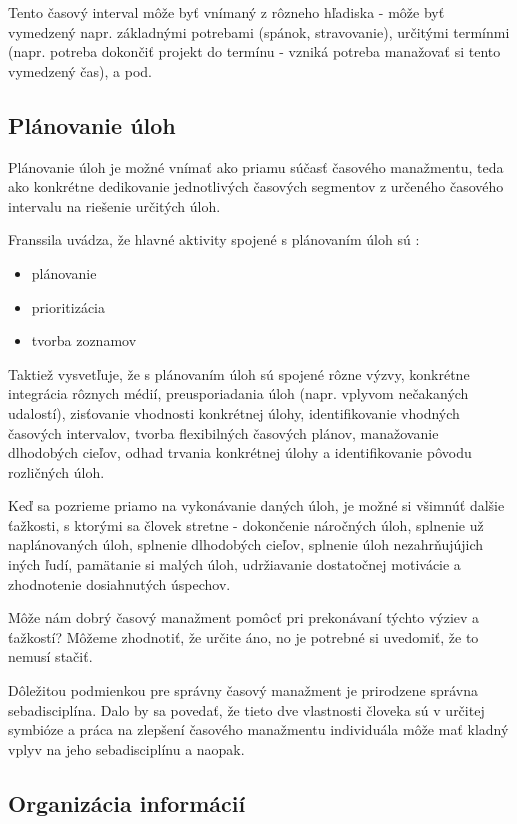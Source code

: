 \documentclass[10pt,slovak,a4paper]{article}
\begin{document}
		Tento časový interval môže byť vnímaný z rôzneho hľadiska - môže byť vymedzený napr. základnými potrebami (spánok, stravovanie), určitými termínmi (napr. potreba dokončiť projekt do termínu - vzniká potreba manažovať si tento vymedzený čas), a pod.
		
	\subsection{Plánovanie úloh}
	
		Plánovanie úloh je možné vnímať ako priamu súčasť časového manažmentu, teda ako konkrétne dedikovanie jednotlivých časových segmentov z určeného časového intervalu na riešenie určitých úloh.
		
		Franssila uvádza, že hlavné aktivity spojené s plánovaním úloh sú \cite{Franssila}:
		\begin{itemize}
			\item plánovanie
			\item prioritizácia
			\item tvorba zoznamov
		\end{itemize}
		
		Taktiež vysvetľuje, že s plánovaním úloh sú spojené rôzne výzvy, konkrétne integrácia rôznych médií, preusporiadania úloh (napr. vplyvom nečakaných udalostí), zisťovanie vhodnosti konkrétnej úlohy, identifikovanie vhodných časových intervalov, tvorba flexibilných časových plánov, manažovanie dlhodobých cieľov, odhad trvania konkrétnej úlohy a identifikovanie pôvodu rozličných úloh\cite{Franssila}.
		
		Keď sa pozrieme priamo na vykonávanie daných úloh, je možné si všimnúť dalšie ťažkosti, s ktorými sa človek stretne - dokončenie náročných úloh, splnenie už naplánovaných úloh, splnenie dlhodobých cieľov, splnenie úloh nezahrňujújich iných ľudí, pamätanie si malých úloh, udržiavanie dostatočnej motivácie a zhodnotenie dosiahnutých úspechov\cite{Franssila}.
		
		Môže nám dobrý časový manažment pomôcť pri prekonávaní týchto výziev a ťažkostí? Môžeme zhodnotiť, že určite áno, no je potrebné si uvedomiť, že to nemusí stačiť.
		
		Dôležitou podmienkou pre správny časový manažment je prirodzene správna sebadisciplína. Dalo by sa povedať, že tieto dve vlastnosti človeka sú v určitej symbióze a práca na zlepšení časového manažmentu individuála môže mať kladný vplyv na jeho sebadisciplínu a naopak.
		
	\subsection{Organizácia informácií}
	
\end{document}
